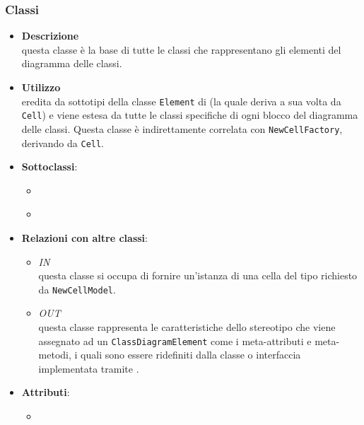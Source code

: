 \subsubsection{Classi}
\label{\nogloxy{swedesigner::client::model::celltypes::class::ClassDiagramElement}}
\begin{itemize}
\item \textbf{Descrizione}\\
questa classe è la base di tutte le classi che rappresentano gli elementi del diagramma delle classi.
\item \textbf{Utilizzo}\\
eredita da sottotipi della classe \texttt{Element} di \jointjs{} (la quale deriva a sua volta da \texttt{Cell}) e viene estesa da tutte le classi specifiche di ogni blocco del diagramma delle classi. Questa classe è indirettamente correlata con \texttt{NewCellFactory}, derivando da \texttt{Cell}.
\item \textbf{Sottoclassi}:
\begin{itemize}
\item \hyperref[\nogloxy{swedesigner::client::model::celltypes::class::HxClass}]{}
\item \hyperref[\nogloxy{swedesigner::client::model::celltypes::class::HxInterface}]{}
\end{itemize}
\item \textbf{Relazioni con altre classi}:
\begin{itemize}
\item \textit{IN} \hyperref[\nogloxy{swedesigner::client::model::NewCellFactory}]{}\\
questa classe si occupa di fornire un'istanza di una cella del tipo richiesto da \texttt{NewCellModel}. 
\item \textit{OUT} \hyperref[\nogloxy{swedesigner::client::model::celltypes::HxStereotype}]{}\\
questa classe rappresenta le caratteristiche dello stereotipo che viene assegnato ad un \texttt{ClassDiagramElement} come i meta-attributi e meta-metodi, i quali sono essere ridefiniti dalla classe o interfaccia implementata tramite \proj{}. 
\end{itemize}
\item \textbf{Attributi}:
\begin{itemize}
\item {}

\end{itemize}
\end{itemize}
